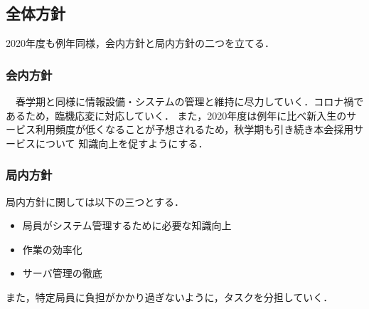 \subsection*{全体方針}

2020年度も例年同様，会内方針と局内方針の二つを立てる．
\subsubsection*{会内方針}
　春学期と同様に情報設備・システムの管理と維持に尽力していく．コロナ禍であるため，臨機応変に対応していく．
また，2020年度は例年に比べ新入生のサービス利用頻度が低くなることが予想されるため，秋学期も引き続き本会採用サービスについて
知識向上を促すようにする．

\subsubsection*{局内方針}
局内方針に関しては以下の三つとする．
\begin{itemize}
    \item 局員がシステム管理するために必要な知識向上
    \item 作業の効率化
    \item サーバ管理の徹底
\end{itemize}
また，特定局員に負担がかかり過ぎないように，タスクを分担していく．
